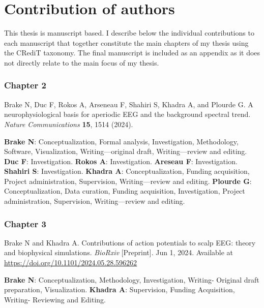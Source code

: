 \chapter*{Contribution of authors}

\setlength{\parindent}{0pt}
\setlength{\parskip}{3pt}

This thesis is manuscript based. I describe below the individual contributions to each manuscript that together constitute the main chapters of my thesis using the CRediT taxonomy. The final manuscript is included as an appendix as it does not directly relate to the main focus of my thesis.

\vspace{-.5em}
\subsection*{Chapter 2}

Brake N, Duc F, Rokos A, Arseneau F, Shahiri S, Khadra A, and Plourde G. A neurophysiological basis for aperiodic EEG and the background spectral trend. \textit{Nature Communications} \textbf{15}, 1514 (2024).

{\small \textbf{Brake N}: Conceptualization, Formal analysis, Investigation, Methodology, Software, Visualization, Writing—original draft, Writing—review and editing. \textbf{Duc F}: Investigation. \textbf{Rokos A}: Investigation. \textbf{Areseau F}: Investigation. \textbf{Shahiri S}: Investigation. \textbf{Khadra A}: Conceptualization, Funding acquisition, Project administration, Supervision, Writing—review and editing. \textbf{Plourde G}: Conceptualization, Data curation, Funding acquisition, Investigation, Project administration, Supervision, Writing—review and editing.}

\vspace{-.5em}
\subsection*{Chapter 3}
Brake N and Khadra A. Contributions of action potentials to scalp EEG: theory and biophysical simulations. \textit{BioRxiv} [Preprint]. Jun 1, 2024. Available at \url{https://doi.org/10.1101/2024.05.28.596262}

{\small \textbf{Brake N}: Conceptualization, Methodology, Investigation, Writing- Original draft preparation, Visualization. \textbf{Khadra A}: Supervision, Funding Acquisition, Writing- Reviewing and Editing.}

